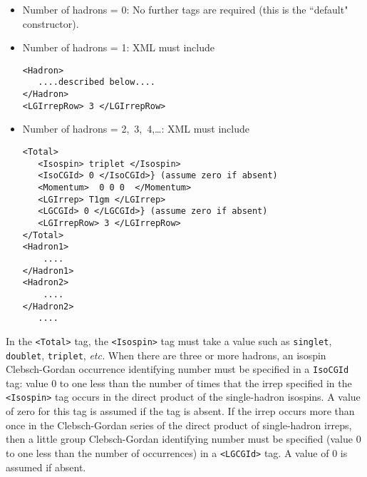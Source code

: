 \documentclass[12pt]{article}
\newcommand{\vb}{\texttt}
\begin{document}
\begin{itemize}
\item                                               
Number of hadrons = 0:                                                              
  No further tags are required                                
     (this is the ``default" constructor).                     
\item                                        
Number of hadrons = 1: XML must include
\begin{verbatim}
<Hadron>                                            
   ....described below....                                
</Hadron>                                              
<LGIrrepRow> 3 </LGIrrepRow>
\end{verbatim}                            
\item                                                                
Number of hadrons = 2,\ 3,\ 4,\dots:  XML must include
\begin{verbatim}                        
<Total>                                                   
   <Isospin> triplet </Isospin>                          
   <IsoCGId> 0 </IsoCGId>} (assume zero if absent)         
   <Momentum>  0 0 0  </Momentum>                          
   <LGIrrep> T1gm </LGIrrep>                             
   <LGCGId> 0 </LGCGId>} (assume zero if absent)           
   <LGIrrepRow> 3 </LGIrrepRow>                           
</Total>                                                    
<Hadron1>                                                  
    ....                                               
</Hadron1>                                                   
<Hadron2>                                                   
    ....                                               
</Hadron2>                                                 
   .... 
\end{verbatim}
\end{itemize}                                                   
In the \vb{<Total>} tag, the \vb{<Isospin>} tag must take a value such  
as \vb{singlet}, \vb{doublet}, \vb{triplet}, \textit{etc.}  When there are      
three or more hadrons, an isospin Clebsch-Gordan occurrence   
identifying number must be specified in a \vb{IsoCGId} tag: value 0 to    
one less than the number of times that the irrep specified in the 
\vb{<Isospin>}
tag occurs in      
the direct product of the single-hadron isospins.  A value    
of zero for this tag is assumed if the tag is absent.         
If the irrep occurs more than once in the Clebsch-Gordan      
series of the direct product of single-hadron irreps, then    
a little group Clebsch-Gordan identifying number      
must be specified (value 0 to one less than the number of     
occurrences) in a \vb{<LGCGId>} tag.  A value of 0 is assumed if absent.             
                                                              
\end{document}

